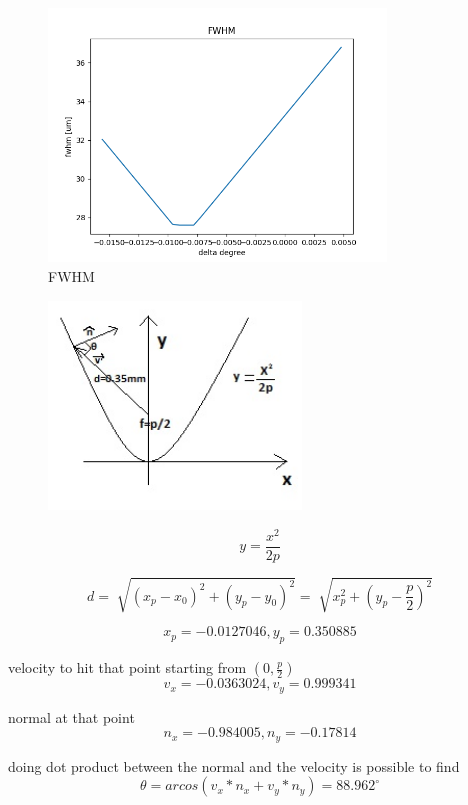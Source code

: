 \documentclass[a4paper]{article}
\begin{document}
\begin{figure}[H]
\centering
\includegraphics[width=0.8\textwidth]{FWHM.png}
\caption{\label{fig:FWHM} FWHM}
\end{figure}

\newpage
{}

\begin{figure}[H]
\centering
\includegraphics[width=0.6\textwidth]{pparabola_1_.jpg}
\end{figure}

\begin{equation*}
y=\frac{x^2}{2p}
\end{equation*}

\begin{equation*}
d=\sqrt[]{(x_p-x_0)^2+(y_p-y_0)^2}=\sqrt[]{x_p^2+(y_p-\frac{p}{2})^2}
\end{equation*}

\begin{equation*}
x_p=-0.0127046, y_p=0.350885
\end{equation*}

velocity to hit that point starting from $(0, \frac{p}{2})$
\begin{equation*}
v_x=-0.0363024, v_y=0.999341
\end{equation*}

normal at that point
\begin{equation*}
n_x=-0.984005, n_y=-0.17814
\end{equation*}

doing dot product between the normal and the velocity is possible to find
\begin{equation*} 
\theta=arcos(v_x*n_x+v_y*n_y)=88.962^\circ
\end{equation*}




\end{document}
